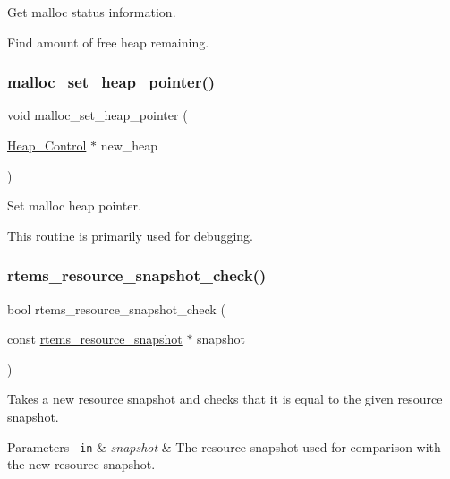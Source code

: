 Get malloc status information. 

Find amount of free heap remaining. \mbox{\label{group__libcsupport_gae2bf8750f6321deff44d391c53df0922}} 
\subsubsection{\texorpdfstring{malloc\_set\_heap\_pointer()}{malloc\_set\_heap\_pointer()}}
{\footnotesize\ttfamily void malloc\+\_\+set\+\_\+heap\+\_\+pointer (\begin{DoxyParamCaption}\item[{\mbox{\hyperlink{structHeap__Control}{Heap\+\_\+\+Control}} $\ast$}]{new\+\_\+heap }\end{DoxyParamCaption})}



Set malloc heap pointer. 

This routine is primarily used for debugging. \mbox{\label{group__libcsupport_ga3f67474826d25c37ae77d2d129bedf59}} 
\subsubsection{\texorpdfstring{rtems\_resource\_snapshot\_check()}{rtems\_resource\_snapshot\_check()}}
{\footnotesize\ttfamily bool rtems\+\_\+resource\+\_\+snapshot\+\_\+check (\begin{DoxyParamCaption}\item[{const \mbox{\hyperlink{structrtems__resource__snapshot}{rtems\+\_\+resource\+\_\+snapshot}} $\ast$}]{snapshot }\end{DoxyParamCaption})}



Takes a new resource snapshot and checks that it is equal to the given resource snapshot. 


\begin{DoxyParams}[1]{Parameters}
\mbox{\texttt{ in}}  & {\em snapshot} & The resource snapshot used for comparison with the new resource snapshot.\\
\hline
\end{DoxyParams}

